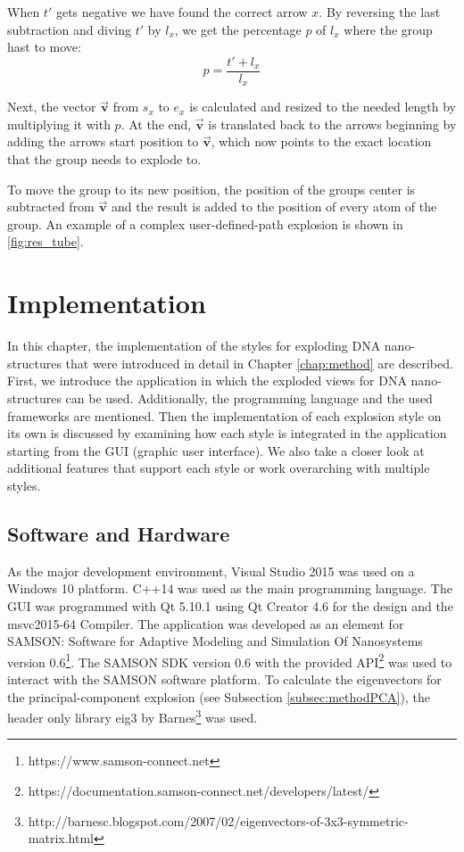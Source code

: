 \documentclass[draft,final]{vutinfth} %
\begin{document}
When $t'$ gets negative we have found the correct arrow $x$.
By reversing the last subtraction and diving $t'$ by $l_x$, we get the percentage $p$ of $l_x$ where the group hast to move:
\begin{equation}
\label{eq:p_path}
p = \frac{t' + l_x}{l_x}
\end{equation}

Next, the vector $\bm{\vec{v}}$ from $s_x$ to $e_x$ is calculated and resized to the needed length by multiplying it with $p$.
At the end, $\bm{\vec{v}}$ is translated back to the arrows beginning by adding the arrows start position to $\bm{\vec{v}}$, which now points to the exact location that the group needs to explode to.

\par To move the group to its new position, the position of the groups center is subtracted from $\bm{\vec{v}}$ and the result is added to the position of every atom of the group. An example of a complex user-defined-path explosion is shown in \autoref{fig:res_tube}.


\chapter{Implementation}
\label{chap:impl}
In this chapter, the implementation of the styles for exploding DNA nano-structures that were introduced in detail in Chapter \ref{chap:method} are described. First, we introduce the application in which the exploded views for DNA nano-structures can be used. Additionally, the programming language and the used frameworks are mentioned. Then the implementation of each explosion style on its own is discussed by examining how each style is integrated in the application starting from the GUI (graphic user interface). We also take a closer look at additional features that support each style or work overarching with multiple styles.

\section{Software and Hardware}
\label{sec:soft}
\par As the major development environment, Visual Studio 2015 was used on a Windows 10 platform.
C++14 was used as the main programming language.
The GUI was programmed with Qt 5.10.1 using Qt Creator 4.6 for the design and the msvc2015-64 Compiler. 
The application was developed as an element for SAMSON: Software for Adaptive Modeling and Simulation Of Nanosystems version 0.6\footnote{https://www.samson-connect.net}. The SAMSON SDK version 0.6 with the provided API\footnote{https://documentation.samson-connect.net/developers/latest/} was used to interact with the SAMSON software platform.
To calculate the eigenvectors for the principal-component explosion (see Subsection \ref{subsec:methodPCA}), the header only library eig3 by Barnes\footnote{http://barnesc.blogspot.com/2007/02/eigenvectors-of-3x3-symmetric-matrix.html} was used.
\end{document}
